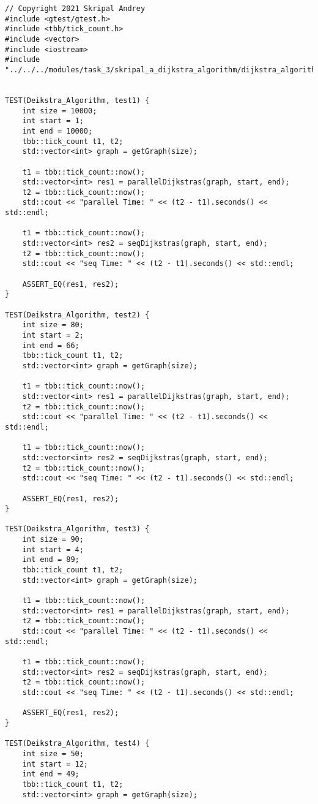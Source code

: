 \documentclass{report}
\begin{document}
\begin{lstlisting}
// Copyright 2021 Skripal Andrey
#include <gtest/gtest.h>
#include <tbb/tick_count.h>
#include <vector>
#include <iostream>
#include "../../../modules/task_3/skripal_a_dijkstra_algorithm/dijkstra_algorithm.h"


TEST(Deikstra_Algorithm, test1) {
    int size = 10000;
    int start = 1;
    int end = 10000;
    tbb::tick_count t1, t2;
    std::vector<int> graph = getGraph(size);

    t1 = tbb::tick_count::now();
    std::vector<int> res1 = parallelDijkstras(graph, start, end);
    t2 = tbb::tick_count::now();
    std::cout << "parallel Time: " << (t2 - t1).seconds() << std::endl;

    t1 = tbb::tick_count::now();
    std::vector<int> res2 = seqDijkstras(graph, start, end);
    t2 = tbb::tick_count::now();
    std::cout << "seq Time: " << (t2 - t1).seconds() << std::endl;

    ASSERT_EQ(res1, res2);
}

TEST(Deikstra_Algorithm, test2) {
    int size = 80;
    int start = 2;
    int end = 66;
    tbb::tick_count t1, t2;
    std::vector<int> graph = getGraph(size);

    t1 = tbb::tick_count::now();
    std::vector<int> res1 = parallelDijkstras(graph, start, end);
    t2 = tbb::tick_count::now();
    std::cout << "parallel Time: " << (t2 - t1).seconds() << std::endl;

    t1 = tbb::tick_count::now();
    std::vector<int> res2 = seqDijkstras(graph, start, end);
    t2 = tbb::tick_count::now();
    std::cout << "seq Time: " << (t2 - t1).seconds() << std::endl;

    ASSERT_EQ(res1, res2);
}

TEST(Deikstra_Algorithm, test3) {
    int size = 90;
    int start = 4;
    int end = 89;
    tbb::tick_count t1, t2;
    std::vector<int> graph = getGraph(size);

    t1 = tbb::tick_count::now();
    std::vector<int> res1 = parallelDijkstras(graph, start, end);
    t2 = tbb::tick_count::now();
    std::cout << "parallel Time: " << (t2 - t1).seconds() << std::endl;

    t1 = tbb::tick_count::now();
    std::vector<int> res2 = seqDijkstras(graph, start, end);
    t2 = tbb::tick_count::now();
    std::cout << "seq Time: " << (t2 - t1).seconds() << std::endl;

    ASSERT_EQ(res1, res2);
}

TEST(Deikstra_Algorithm, test4) {
    int size = 50;
    int start = 12;
    int end = 49;
    tbb::tick_count t1, t2;
    std::vector<int> graph = getGraph(size);


\end{lstlisting}
\end{document}
